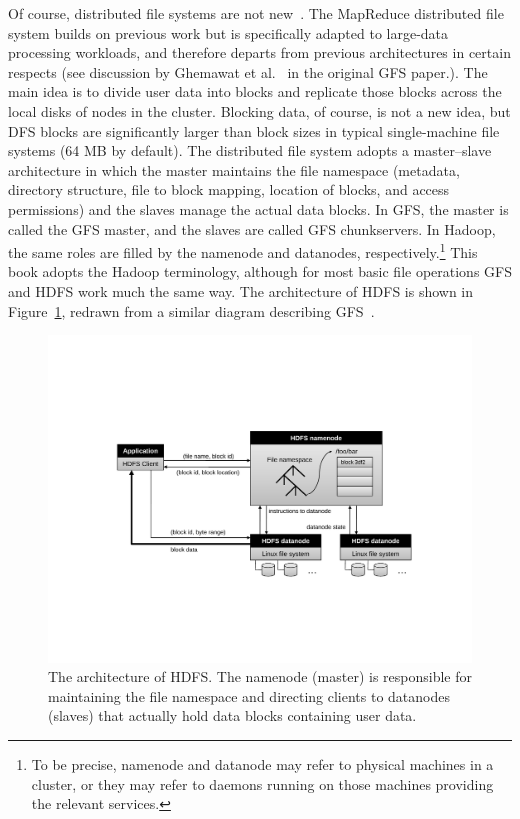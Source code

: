 Of course, distributed file systems are not
new~\cite{Howard_etal_1988,Cabrera_Long_1991,Anderson_etal_SOSP1995,Thekkath_etal_SOSP1997,Schmuck_Haskin_2002}.
The MapReduce distributed file system builds on previous work but is
specifically adapted to large-data processing workloads, and therefore
departs from previous architectures in certain respects (see
discussion by Ghemawat et al.~\cite{Ghemawat_etal_SOSP2003} in the
original GFS paper.).  The main idea is to divide user data into
blocks and replicate those blocks across the local disks of nodes in
the cluster.  Blocking data, of course, is not a new idea, but DFS
blocks are significantly larger than block sizes in typical
single-machine file systems (64 MB by default).  The distributed file
system adopts a master--slave architecture in which the master
maintains the file namespace (metadata, directory structure, file to
block mapping, location of blocks, and access permissions) and the
slaves manage the actual data blocks.  In GFS, the master is called
the GFS master, and the slaves are called GFS chunkservers.  In
Hadoop, the same roles are filled by the namenode and datanodes,
respectively.\footnote{To be precise, namenode and datanode may refer
to physical machines in a cluster, or they may refer to daemons
running on those machines providing the relevant services.} This book
adopts the Hadoop terminology, although for most basic file operations
GFS and HDFS work much the same way.  The architecture of HDFS is
shown in Figure~\ref{figure:chapter2:HDFS}, redrawn from a similar
diagram describing GFS~\cite{Ghemawat_etal_SOSP2003}.

\begin{figure}[t]
\begin{center}
\vspace{0.2cm}
\includegraphics[scale=0.6]{figures/fig-ch2-HDFS.pdf}
\vspace{-0.3cm}
\end{center}
\caption{The architecture of HDFS.  The namenode (master) is responsible for maintaining the file
  namespace and directing clients to datanodes (slaves) that actually
  hold data blocks containing user data.}
\label{figure:chapter2:HDFS}
\end{figure}

